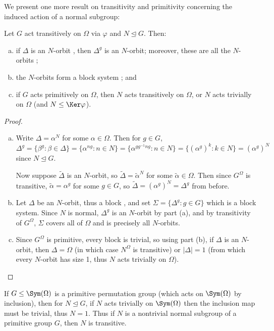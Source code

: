 We present one more result on transitivity and primitivity concerning the induced action of a normal subgroup:

\begin{proposition}\label{prop:normal_subgroup_transitive_action}
    Let $G$ act transitively on $\Omega$ via $\varphi$ and $N \unlhd G$. Then:
    \begin{enumerate}[(a)]
        \item if $\Delta$ is an $N$-orbit , then $\Delta^g$ is an $N$-orbit; moreover, these are all the $N$-orbits ;
        \item the $N$-orbits form a block system ; and
        \item if $G$ acts primitively on $\Omega$, then $N$ acts transitively on $\Omega$, or $N$ acts trivially on $\Omega$ (and $N \leq \Ker\varphi$).
    \end{enumerate}
\end{proposition}

\begin{proof}
    \begin{enumerate}[(a)]
        \item Write $\Delta = \alpha^N$ for some $\alpha \in \Omega$. Then for $g \in G$, $\Delta^g = \{\beta^g : \beta \in \Delta\} = \{\alpha^{ng} : n \in N\} = \{\alpha^{gg^{-1}ng} : n \in N\} = \{(\alpha^g)^k : k \in N\} = (\alpha^g)^N$ since $N \unlhd G$.

              Now suppose $\tilde\Delta$ is an $N$-orbit, so $\tilde\Delta = \tilde\alpha^N$ for some $\tilde\alpha \in \Omega$. Then since $G^\Omega$ is transitive, $\tilde\alpha = \alpha^g$ for some $g \in G$, so $\tilde\Delta = (\alpha^g)^N = \Delta^g$ from before.
        \item Let $\Delta$ be an $N$-orbit, thus a block , and set $\Sigma = \{\Delta^g : g \in G\}$ which is a block system. Since $N$ is normal, $\Delta^g$ is an $N$-orbit by part (a), and by transitivity of $G^\Omega$, $\Sigma$ covers all of $\Omega$ and is precisely all $N$-orbits.
        \item Since $G^\Omega$ is primitive, every block is trivial, so using part (b), if $\Delta$ is an $N$-orbit, then $\Delta = \Omega$ (in which case $N^\Omega$ is transitive) or $|\Delta| = 1$ (from which every $N$-orbit has size 1, thus $N$ acts trivially on $\Omega$).
    \end{enumerate}
\end{proof}

If $G \leq \Sym(\Omega)$ is a primitive permutation group (which acts on $\Sym(\Omega)$ by inclusion), then for $N \unlhd G$, if $N$ acts trivially on $\Sym(\Omega)$ then the inclusion map must be trivial, thus $N = 1$. Thus if $N$ is a nontrivial normal subgroup of a primitive group $G$, then $N$ is transitive.